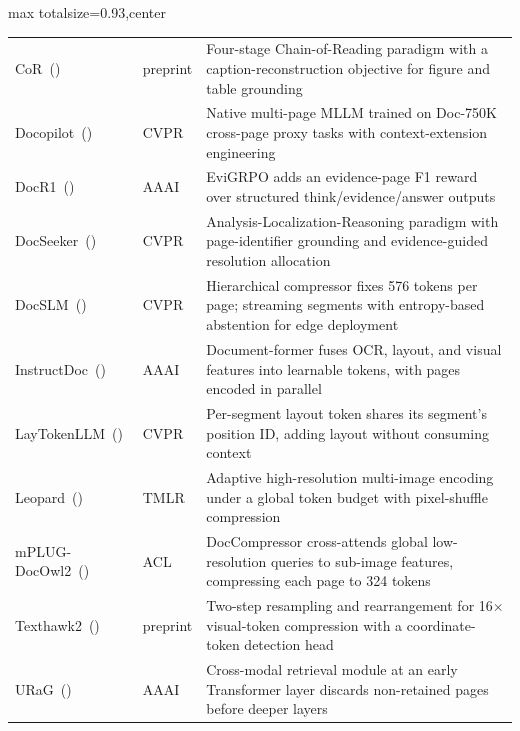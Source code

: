 \begin{table}[p]
\begin{adjustbox}{max totalsize={\textwidth}{0.93\textheight},center}
\begin{tabular}{@{}l l >{\raggedright\arraybackslash}p{}@{}}
\rowcolor{sectionbg}
\multicolumn{3}{l}{\textbf{MLLM-Centric Adaptation Models}} \\
\midrule
  {CoR}~(\citeyear{guo2026end}) & preprint & Four-stage Chain-of-Reading paradigm with a caption-reconstruction objective for figure and table grounding \\
  {Docopilot}~(\citeyear{duan2025docopilot}) & CVPR & Native multi-page MLLM trained on Doc-750K cross-page proxy tasks with context-extension engineering \\
  {DocR1}~(\citeyear{xiong2026docr1}) & AAAI & EviGRPO adds an evidence-page F1 reward over structured think/evidence/answer outputs \\
  {DocSeeker}~(\citeyear{yan2026docseeker}) & CVPR & Analysis-Localization-Reasoning paradigm with page-identifier grounding and evidence-guided resolution allocation \\
  {DocSLM}~(\citeyear{hannan2026docslm}) & CVPR & Hierarchical compressor fixes 576 tokens per page; streaming segments with entropy-based abstention for edge deployment \\
  {InstructDoc}~(\citeyear{tanaka2024instructdoc}) & AAAI & Document-former fuses OCR, layout, and visual features into learnable tokens, with pages encoded in parallel \\
  {LayTokenLLM}~(\citeyear{zhu2025simple}) & CVPR & Per-segment layout token shares its segment's position ID, adding layout without consuming context \\
  {Leopard}~(\citeyear{jia2025leopard}) & TMLR & Adaptive high-resolution multi-image encoding under a global token budget with pixel-shuffle compression \\
  {mPLUG-DocOwl2}~(\citeyear{hu2025mplug}) & ACL & DocCompressor cross-attends global low-resolution queries to sub-image features, compressing each page to 324 tokens \\
  {Texthawk2}~(\citeyear{yu2024texthawk2}) & preprint & Two-step resampling and rearrangement for 16$\times$ visual-token compression with a coordinate-token detection head \\
  {URaG}~(\citeyear{shi2026urag}) & AAAI & Cross-modal retrieval module at an early Transformer layer discards non-retained pages before deeper layers \\

\midrule[0.4pt]


\end{tabular}
\end{adjustbox}
\end{table}
